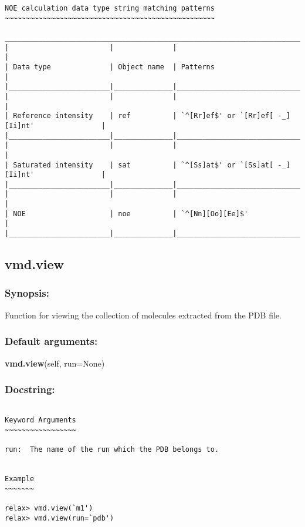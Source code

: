 {\begin{verbatim}
NOE calculation data type string matching patterns
~~~~~~~~~~~~~~~~~~~~~~~~~~~~~~~~~~~~~~~~~~~~~~~~~~

____________________________________________________________________________________________
|                        |              |                                                  |
| Data type              | Object name  | Patterns                                         |
|________________________|______________|__________________________________________________|
|                        |              |                                                  |
| Reference intensity    | ref          | `^[Rr]ef$' or `[Rr]ef[ -_][Ii]nt'                |
|________________________|______________|__________________________________________________|
|                        |              |                                                  |
| Saturated intensity    | sat          | `^[Ss]at$' or `[Ss]at[ -_][Ii]nt'                |
|________________________|______________|__________________________________________________|
|                        |              |                                                  |
| NOE                    | noe          | `^[Nn][Oo][Ee]$'                                 |
|________________________|______________|__________________________________________________|
\end{verbatim}
}



\newpage

\subsection{vmd.view}


\subsubsection{Synopsis:}

Function for viewing the collection of molecules extracted from the PDB file.

\subsubsection{Default arguments:}

\textsf{\textbf{vmd.view}(self, run=None)
}


\subsubsection{Docstring:}

{\scriptsize
\begin{verbatim}

Keyword Arguments
~~~~~~~~~~~~~~~~~

run:  The name of the run which the PDB belongs to.


Example
~~~~~~~

relax> vmd.view(`m1')
relax> vmd.view(run=`pdb')
\end{verbatim}
}

